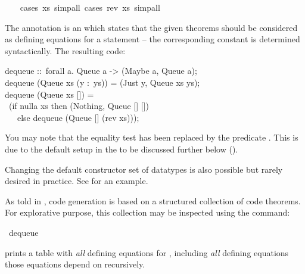 \begin{isabellebody}
\ \ \isamarkupfalse%
\ {\isacharparenleft}cases\ xs{\isacharcomma}\ simp{\isacharunderscore}all{\isacharparenright}\ {\isacharparenleft}cases\ {\isachardoublequoteopen}rev\ xs{\isachardoublequoteclose}{\isacharcomma}\ simp{\isacharunderscore}all{\isacharparenright}%
\endisatagquote
{\isafoldquote}%
%
\isadelimquote
%
\endisadelimquote
%
\begin{isamarkuptext}%
\noindent The annotation  is an 
   which states that the given theorems should be
  considered as defining equations for a  statement --
  the corresponding constant is determined syntactically.  The resulting code:%
\end{isamarkuptext}%
\isamarkuptrue%
%
\isadelimquote
%
\endisadelimquote
%
\isatagquote
%
\begin{isamarkuptext}%
\isaverbatim%
\noindent%
\hspace*{0pt}dequeue ::~forall a. Queue a -> (Maybe a, Queue a);\\
\hspace*{0pt}dequeue (Queue xs (y :~ys)) = (Just y, Queue xs ys);\\
\hspace*{0pt}dequeue (Queue xs []) =\\
\hspace*{0pt} ~(if nulla xs then (Nothing, Queue [] [])\\
\hspace*{0pt} ~~~else dequeue (Queue [] (rev xs)));%
\end{isamarkuptext}%
\isamarkuptrue%
%
\endisatagquote
{\isafoldquote}%
%
\isadelimquote
%
\endisadelimquote
%
\begin{isamarkuptext}%
\noindent You may note that the equality test  has been
  replaced by the predicate .  This is due to the default
  setup in the  to be discussed further below ().

  Changing the default constructor set of datatypes is also
  possible but rarely desired in practice.  See  for an example.

  As told in , code generation is based
  on a structured collection of code theorems.
  For explorative purpose, this collection
  may be inspected using the \hyperlink{command.code-thms}{\mbox{}} command:%
\end{isamarkuptext}%
\isamarkuptrue%
%
\isadelimquote
%
\endisadelimquote
%
\isatagquote
{}\isamarkupfalse%
\ dequeue%
\endisatagquote
{\isafoldquote}%
%
\isadelimquote
%
\endisadelimquote
%
\begin{isamarkuptext}%
\noindent prints a table with \emph{all} defining equations
  for , including
  \emph{all} defining equations those equations depend
  on recursively.
  

\end{isamarkuptext}
\end{isabellebody}
